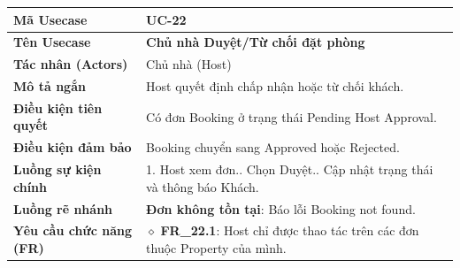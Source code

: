 \begin{table}[H]
\renewcommand{\arraystretch}{1.3}
\centering
\begin{tabularx}{\textwidth}{|p{4.5cm}|X|}
\hline
\cellcolor{gray!15}\bfseries Mã Usecase & \textbf{UC-22} \\ \hline
\cellcolor{gray!15}\bfseries Tên Usecase & \textbf{Chủ nhà Duyệt/Từ chối đặt phòng} \\ \hline
\cellcolor{gray!15}\bfseries Tác nhân (Actors) & Chủ nhà (Host) \\ \hline
\cellcolor{gray!15}\bfseries Mô tả ngắn & Host quyết định chấp nhận hoặc từ chối khách. \\ \hline
\cellcolor{gray!15}\bfseries Điều kiện tiên quyết & Có đơn Booking ở trạng thái Pending Host Approval. \\ \hline
\cellcolor{gray!15}\bfseries Điều kiện đảm bảo & Booking chuyển sang Approved hoặc Rejected. \\ \hline
\cellcolor{gray!15}\bfseries Luồng sự kiện chính & 1. Host xem đơn.\newline 2. Chọn Duyệt.\newline 3. Cập nhật trạng thái và thông báo Khách. \\ \hline
\cellcolor{gray!15}\bfseries Luồng rẽ nhánh & \textbf{Đơn không tồn tại}: Báo lỗi Booking not found. \\ \hline
\cellcolor{gray!15}\bfseries Yêu cầu chức năng (FR) & $\diamond$ \textbf{FR\_22.1}: Host chỉ được thao tác trên các đơn thuộc Property của mình. \\ \hline
\end{tabularx}
\end{table}

